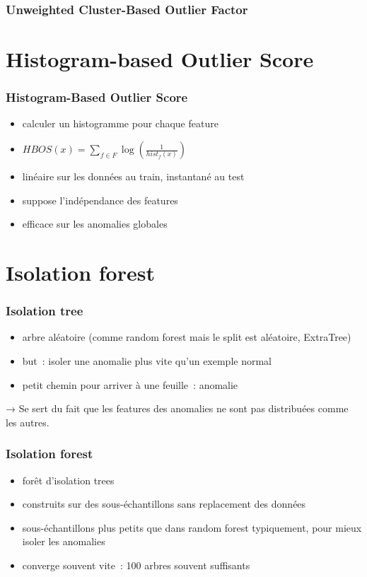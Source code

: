 \documentclass{formation}
\begin{document}
\begin{frame}
  \frametitle{Unweighted Cluster-Based Outlier Factor}

\end{frame}

\section{Histogram-based Outlier Score}

\begin{frame}
  \frametitle{Histogram-Based Outlier Score}

  \begin{itemize}[<+->]
  \item calculer un histogramme pour chaque feature
  \item $HBOS(x) = \sum_{f\in F}\log(\frac{1}{hist_f(x)})$
  \item linéaire sur les données au train, instantané au test
  \item suppose l'indépendance des features \red{(!!!)}
  \item efficace sur les anomalies globales
  \end{itemize}
\end{frame}

\section{Isolation forest}

\begin{frame}
  \frametitle{Isolation tree}
  \begin{itemize}
  \item arbre aléatoire (comme random forest mais le split est
    aléatoire, ExtraTree)
  \item but : isoler une anomalie plus vite qu'un exemple normal
  \item petit chemin pour arriver à une feuille : anomalie
  \end{itemize}

  → Se sert du fait que les features des anomalies ne sont pas
  distribuées comme les autres.
\end{frame}

\begin{frame}
  \frametitle{Isolation forest}

  \begin{itemize}
  \item forêt d'isolation trees
  \item construits sur des sous-échantillons sans replacement des
    données
  \item sous-échantillons plus petits que dans random forest
    typiquement, pour mieux isoler les anomalies
  \item converge souvent vite : 100 arbres souvent suffisants
  \end{itemize}
\end{frame}
\end{document}
